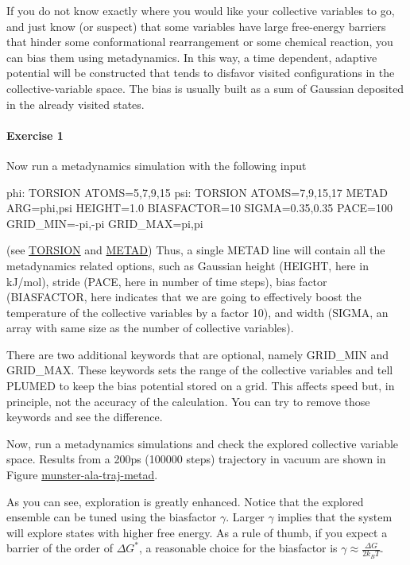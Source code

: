 If you do not know exactly where you would like your collective variables to go, and just know (or suspect) that some variables have large free-\/energy barriers that hinder some conformational rearrangement or some chemical reaction, you can bias them using metadynamics. In this way, a time dependent, adaptive potential will be constructed that tends to disfavor visited configurations in the collective-\/variable space. The bias is usually built as a sum of Gaussian deposited in the already visited states.\hypertarget{munster_munster-exercise-1}{}\paragraph{Exercise 1}\label{munster_munster-exercise-1}
Now run a metadynamics simulation with the following input \begin{DoxyVerb}phi: TORSION ATOMS=5,7,9,15
psi: TORSION ATOMS=7,9,15,17
METAD ARG=phi,psi HEIGHT=1.0 BIASFACTOR=10 SIGMA=0.35,0.35 PACE=100 GRID_MIN=-pi,-pi GRID_MAX=pi,pi
\end{DoxyVerb}
 (see \hyperlink{TORSION}{T\+O\+R\+S\+I\+O\+N} and \hyperlink{METAD}{M\+E\+T\+A\+D}) Thus, a single M\+E\+T\+A\+D line will contain all the metadynamics related options, such as Gaussian height ({\ttfamily H\+E\+I\+G\+H\+T}, here in k\+J/mol), stride ({\ttfamily P\+A\+C\+E}, here in number of time steps), bias factor ({\ttfamily B\+I\+A\+S\+F\+A\+C\+T\+O\+R}, here indicates that we are going to effectively boost the temperature of the collective variables by a factor 10), and width ({\ttfamily S\+I\+G\+M\+A}, an array with same size as the number of collective variables).

There are two additional keywords that are optional, namely G\+R\+I\+D\+\_\+\+M\+I\+N and G\+R\+I\+D\+\_\+\+M\+A\+X. These keywords sets the range of the collective variables and tell P\+L\+U\+M\+E\+D to keep the bias potential stored on a grid. This affects speed but, in principle, not the accuracy of the calculation. You can try to remove those keywords and see the difference.

Now, run a metadynamics simulations and check the explored collective variable space. Results from a 200ps (100000 steps) trajectory in vacuum are shown in Figure \hyperlink{munster_munster-ala-traj-metad}{munster-\/ala-\/traj-\/metad}.

\label{munster_munster-ala-traj-metad}%
\hypertarget{munster_munster-ala-traj-metad}{}%
 As you can see, exploration is greatly enhanced. Notice that the explored ensemble can be tuned using the biasfactor $\gamma$. Larger $\gamma$ implies that the system will explore states with higher free energy. As a rule of thumb, if you expect a barrier of the order of $\Delta G^*$, a reasonable choice for the biasfactor is $\gamma\approx\frac{\Delta G}{2k_BT}$.

